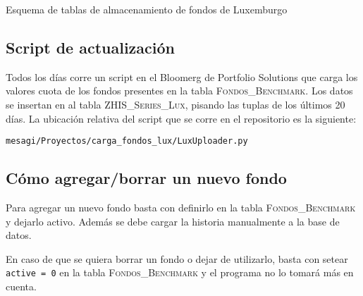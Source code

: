 \documentclass{article}
\begin{document}
\begin{table}[h]
{\small
{}}
\caption{Esquema de tablas de almacenamiento de fondos de Luxemburgo}
\label{bmk-sch}
\end{table}



\subsection{Script de actualización}

Todos los días corre un script en el Bloomerg de Portfolio Solutions que carga los valores cuota de los fondos presentes en la tabla \textsc{Fondos\_Benchmark}. Los datos se insertan en al tabla \textsc{ZHIS\_Series\_Lux}, pisando las tuplas de los últimos 20 días. La ubicación relativa del script que se corre en el repositorio es la siguiente:
\begin{center}
\texttt{mesagi/Proyectos/carga\_fondos\_lux/LuxUploader.py}
\end{center}


\subsection{Cómo agregar/borrar un nuevo fondo}

Para agregar un nuevo fondo basta con definirlo en la tabla \textsc{Fondos\_Benchmark} y dejarlo activo. Además se debe cargar la historia manualmente a la base de datos. 


En caso de que se quiera borrar un fondo o dejar de utilizarlo, basta con setear \texttt{active = 0} en la tabla \textsc{Fondos\_Benchmark} y el programa no lo tomará más en cuenta.
\end{document}
